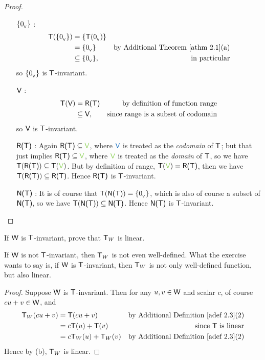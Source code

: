 \begin{proof} \ 

\begin{enumerate}
\item[\(\{ 0_{_{\textsf{V}}} \}\)]:
    \begin{align*}
        \T(\{ \OV \}) & = \{ \T(\OV) \} \\
                      & = \{ \OV \} & \text{by \ATHM{2.1}(a)} \\
                      & \subseteq \{ \OV \}, & \text{in particular}
    \end{align*}
    so \(\{ 0_{_{\textsf{V}}} \}\) is \(\textsf{T}\)-invariant.
\item[\(\textsf{V}\)]:
    \begin{align*}
        \textsf{T}(\textsf{V}) & = \textsf{R(T)} & \text{by definition of function range} \\
              & \subseteq \textsf{V}, & \text{since range is a subset of codomain}
    \end{align*}
    so \(\textsf{V}\) is \(\textsf{T}\)-invariant.
\item[\(\textsf{R(T)}\)]:
    Again \(\RANGET \subseteq \GREEN{\V}\), where \(\BLUE{\V}\) is treated as the \emph{codomain} of \(\textsf{T}\);
    but that just implies \(\RANGET \subseteq \GREEN{\V}\), where \(\GREEN{\V}\) is treated as the \emph{domain} of \(\textsf{T}\), so we have \(\T(\RANGET) \subseteq \T(\GREEN{\V})\).
    But by definition of range, \(\T(\GREEN{\V}) = \RANGET\), then we have \(\textsf{T}(\textsf{R(T)}) \subseteq \textsf{R(T)}\).
    Hence \(\textsf{R(T)}\) is \(\textsf{T}\)-invariant.
\item[\(\textsf{N(T)}\)]:
    It is of course that \(\textsf{T}(\textsf{N(T)}) = \{ 0_{_{\textsf{V}}} \}\), which is also of course a subset of \(\textsf{N(T)}\), so we have \(\textsf{T}(\textsf{N(T)}) \subseteq \textsf{N(T)}\).
    Hence \(\textsf{N(T)}\) is \(\textsf{T}\)-invariant.
\end{enumerate}
\end{proof}

\begin{exercise} \label{exercise 2.1.30}
If \(\textsf{W}\) is \(\textsf{T}\)-invariant, prove that \(\textsf{T}_W\) is linear.
\end{exercise}

\begin{note}
If \(\textsf{W}\) is not \(\textsf{T}\)-invariant, then \(\textsf{T}_W\) is not even well-defined.
What the exercise wants to say is, if \(\textsf{W}\) is \(\textsf{T}\)-invariant, then \(\textsf{T}_W\) is not only well-defined function, but also linear.
\end{note}

\begin{proof}
Suppose \(\textsf{W}\) is \(\textsf{T}\)-invariant.
Then for any \(u, v \in \textsf{W}\) and scalar \(c\), of course \(cu + v \in \textsf{W}\), and
\begin{align*}
    \T_W(cu + v) & = \T(cu + v) & \text{by \ADEF{2.3}(2)} \\
                 & = c\T(u) + \T(v) & \text{since \(\T\) is linear} \\
                 & = c\T_W(u) + \T_W(v) & \text{by \ADEF{2.3}(2)}
\end{align*}
Hence by (b), \(\textsf{T}_W\) is linear.
\end{proof}

